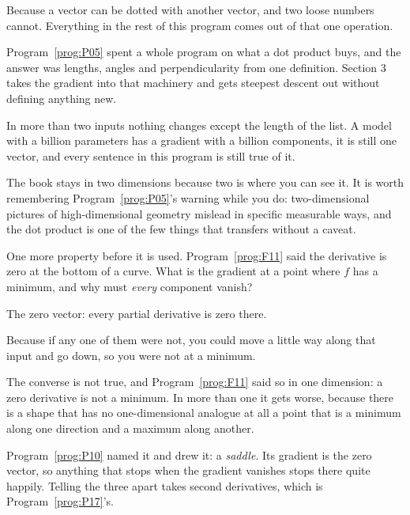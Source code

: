 \begin{fr}
\begin{ansblock}
Because a vector can be dotted with another vector, and two loose numbers
cannot. Everything in the rest of this program comes out of that one
operation.
\end{ansblock}

Program~\ref{prog:P05} spent a whole program on what a dot product buys, and
the answer was lengths, angles and perpendicularity from one definition.
Section 3 takes the gradient into that machinery and gets steepest descent
out without defining anything new.

\begin{note}
In more than two inputs nothing changes except the length of the list. A model
with a billion parameters has a gradient with a billion components, it is
still one vector, and every sentence in this program is still true of it.

The book stays in two dimensions because two is where you can see it. It is
worth remembering Program~\ref{prog:P05}'s warning while you do:
two-dimensional pictures of high-dimensional geometry mislead in specific
measurable ways, and the dot product is one of the few things that transfers
without a caveat.
\end{note}
\end{fr}

\begin{fr}
One more property before it is used. Program~\ref{prog:F11} said the
derivative is zero at the bottom of a curve. What is the gradient at a point
where $f$ has a minimum, and why must \emph{every} component vanish?
\nextframe
\end{fr}

\begin{fr}
\begin{ansblock}
The zero vector: every partial derivative is zero there.
\end{ansblock}

Because if any one of them were not, you could move a little way along that
input and go down, so you were not at a minimum.

\begin{trapbox}
The converse is not true, and Program~\ref{prog:F11} said so in one
dimension: a zero derivative is not a minimum. In more than one it gets
worse, because there is a shape that has no one-dimensional analogue at all
\dash{} a point that is a minimum along one direction and a maximum along
another.

Program~\ref{prog:P10} named it and drew it: a \emph{saddle}. Its gradient is
the zero vector, so anything that stops when the gradient vanishes stops
there quite happily. Telling the three apart takes second derivatives, which
is Program~\ref{prog:P17}'s.
\end{trapbox}
\end{fr}

